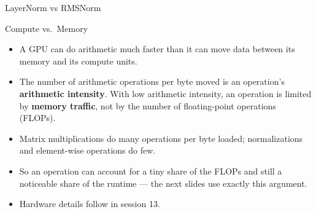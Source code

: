\begin{frame}{LayerNorm vs RMSNorm}
\small
\renewcommand{\arraystretch}{1.3}
\end{frame}


\begin{frame}{Compute vs.\ Memory}
\begin{itemize}
  \item A GPU can do arithmetic much faster than it can move data between its memory and its compute units.
  \item The number of arithmetic operations per byte moved is an operation's \textbf{arithmetic intensity}. With low arithmetic intensity, an operation is limited by \textbf{memory traffic}, not by the number of floating-point operations (FLOPs).
  \item Matrix multiplications do many operations per byte loaded; normalizations and element-wise operations do few.
  \item So an operation can account for a tiny share of the FLOPs and still a noticeable share of the runtime --- the next slides use exactly this argument.
  \item Hardware details follow in session 13.
\end{itemize}
\end{frame}

